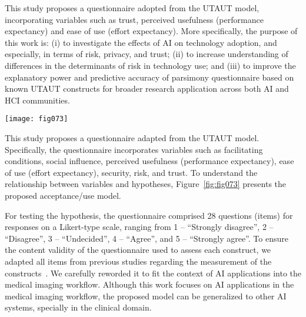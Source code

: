 This study proposes a questionnaire adopted from the UTAUT model, incorporating variables such as trust, perceived usefulness (performance expectancy) and ease of use (effort expectancy).
More specifically, the purpose of this work is: (i) to investigate the effects of AI on technology adoption, and especially, in terms of risk, privacy, and trust; (ii) to increase understanding of differences in the determinants of risk in technology use; and (iii) to improve the explanatory power and predictive accuracy of parsimony questionnaire based on known UTAUT constructs for broader research application across both AI and HCI communities.

\begin{figure*}
\centering
\texttt{[image: fig073]}
\caption{The w, comparing the relations between moderating effects, model constructs and hypotheses. We adapted this proposed research model from the UTAUT theoretical model to explain the actual adoption of AI in the medical imaging workflow. The research model includes 10 factors. We measured each factor with multiple items. Moreover, we adapted all items from extant literature to improve content validity.}
\label{fig:fig073}
\end{figure*}

This study proposes a questionnaire adapted from the UTAUT model.
Specifically, the questionnaire incorporates variables such as facilitating conditions, social influence, perceived usefulness (performance expectancy), ease of use (effort expectancy), security, risk, and trust.
To understand the relationship between variables and hypotheses, Figure~\ref{fig:fig073} presents the proposed acceptance/use model.

For testing the hypothesis, the questionnaire comprised 28 questions (items) for responses on a Likert-type scale, ranging from 1 -- ``Strongly disagree'', 2 -- ``Disagree'', 3 -- ``Undecided'', 4 -- ``Agree'', and 5 -- ``Strongly agree''.
To ensure the content validity of the questionnaire used to assess each construct, we adapted all items from previous studies regarding the measurement of the constructs~\cite{BOOTSMAN201999, LOOIJE2010386}.
We carefully reworded it to fit the context of AI applications into the medical imaging workflow.
Although this work focuses on AI applications in the medical imaging workflow, the proposed model can be generalized to other AI systems, specially in the clinical domain.


